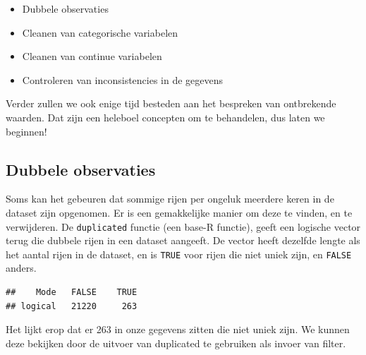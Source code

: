 \documentclass[]{tufte-book}
\newenvironment{Shaded}{}{}
\newcommand{\KeywordTok}[1]{\textcolor[rgb]{0.00,0.44,0.13}{\textbf{#1}}}
\newcommand{\NormalTok}[1]{#1}
\newcommand{\OperatorTok}[1]{\textcolor[rgb]{0.40,0.40,0.40}{#1}}
\newcommand{\StringTok}[1]{\textcolor[rgb]{0.25,0.44,0.63}{#1}}
\providecommand{\tightlist}{%
  \setlength{\itemsep}{0pt}\setlength{\parskip}{0pt}}
\begin{document}
\begin{itemize}
\tightlist
\item
  Dubbele observaties
\item
  Cleanen van categorische variabelen
\item
  Cleanen van continue variabelen
\item
  Controleren van inconsistencies in de gegevens
\end{itemize}

Verder zullen we ook enige tijd besteden aan het bespreken van ontbrekende waarden. Dat zijn een heleboel concepten om te behandelen, dus laten we beginnen!

\hypertarget{dubbele-observaties}{%
\subsection{Dubbele observaties}\label{dubbele-observaties}}

Soms kan het gebeuren dat sommige rijen per ongeluk meerdere keren in de dataset zijn opgenomen. Er is een gemakkelijke manier om deze te vinden, en te verwijderen.
De \texttt{duplicated} functie (een base-R functie), geeft een logische vector terug die dubbele rijen in een dataset aangeeft. De vector heeft dezelfde lengte als het aantal rijen in de dataset, en is \texttt{TRUE} voor rijen die niet uniek zijn, en \texttt{FALSE} anders.

\begin{Shaded}
\end{Shaded}

\begin{verbatim}
##    Mode   FALSE    TRUE 
## logical   21220     263
\end{verbatim}

Het lijkt erop dat er 263 in onze gegevens zitten die niet uniek zijn. We kunnen deze bekijken door de uitvoer van duplicated te gebruiken als invoer van filter.

\begin{Shaded}
\end{Shaded}
\end{document}
